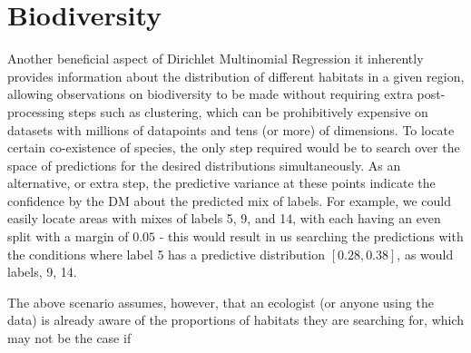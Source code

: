 \section{Biodiversity}

Another beneficial aspect of Dirichlet Multinomial Regression it inherently provides information about the distribution of different habitats in a given region, allowing observations on biodiversity to be made without requiring extra post-processing steps such as clustering, which can be prohibitively expensive on datasets with millions of datapoints and tens (or more) of dimensions. To locate certain co-existence of species, the only step required would be to search over the space of predictions for the desired distributions simultaneously. As an alternative, or extra step, the predictive variance at these points indicate the confidence by the DM about the predicted mix of labels. 
For example, we could easily locate areas with mixes of  labels 5, 9, and 14, with each having an even split with a margin of $0.05$ - this would result in us searching the predictions with the conditions where label 5 has a predictive distribution $[0.28, 0.38]$, as would labels, 9, 14. 


The above scenario assumes, however, that an ecologist (or anyone using the data) is already aware of the proportions of habitats they are searching for, which may not be the case if 

